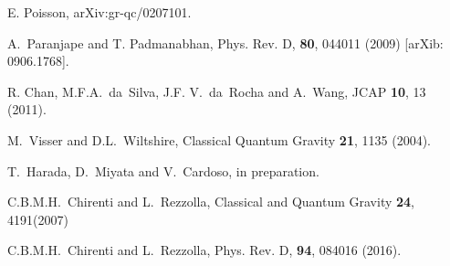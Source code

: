 \documentclass[aps,preprint,preprintnumber,nofootinbib,amsmath,amssymb,ascmac,bm,12pt]{revtex4}
\begin{document}
\begin{thebibliography}{9}
E. Poisson, arXiv:gr-qc/0207101. 



A.~Paranjape and T. Padmanabhan, Phys. Rev. D, {\bf 80}, 044011 (2009) [arXib: 0906.1768].

R. Chan, M.F.A.~da~Silva, J.F. V.~da~Rocha and A.~Wang, JCAP {\bf 10}, 13 (2011).

M.~Visser and D.L.~Wiltshire, Classical Quantum Gravity {\bf 21}, 1135 (2004). 

T.~Harada, D.~Miyata and V.~Cardoso, in preparation. 

C.B.M.H.~Chirenti and L.~Rezzolla, Classical and Quantum Gravity {\bf 24}, 4191(2007)

C.B.M.H.~Chirenti and L.~Rezzolla,  Phys. Rev. D, {\bf 94}, 084016 (2016). 



\end{thebibliography}
\end{document}
